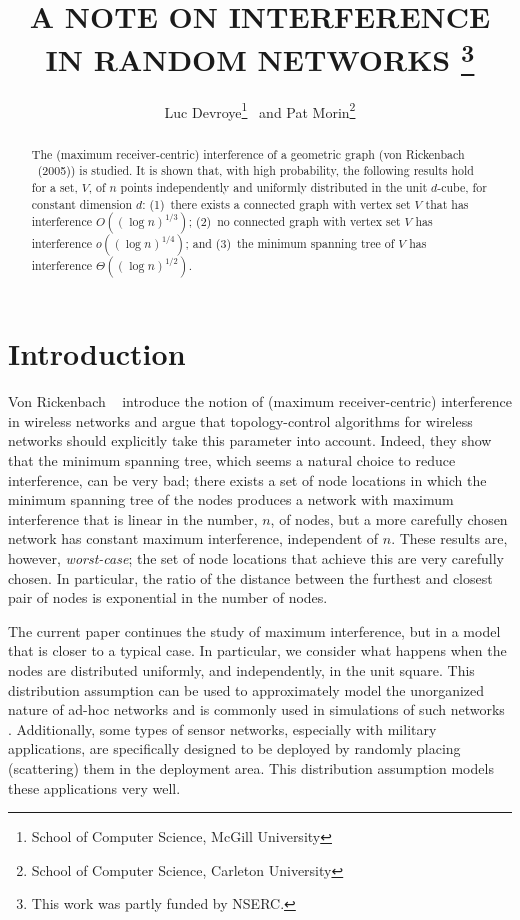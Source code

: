 \documentclass{patmorin}
\title{\MakeTextUppercase{A Note on Interference in Random Networks}%
   \thanks{This work was partly funded by NSERC.}}
\author{Luc Devroye\thanks{School of Computer Science, McGill University}
        \ and
        Pat Morin\thanks{School of Computer Science, Carleton University}}
\begin{document}
\maketitle

\begin{abstract}
  The (maximum receiver-centric) interference of a geometric graph
  (von Rickenbach \etal\ (2005)) is studied.  It is shown that,
  with high probability, the following results hold for a set, $V$,
  of $n$ points independently and uniformly distributed in the unit
  $d$-cube, for constant dimension $d$: (1)~there exists a connected
  graph with vertex set $V$ that has interference $O((\log n)^{1/3})$;
  (2)~no connected graph with vertex set $V$ has interference $o((\log
  n)^{1/4})$; and (3)~the minimum spanning tree of $V$ has interference
  $\Theta((\log n)^{1/2})$.
\end{abstract}

\section{Introduction}

Von Rickenbach \etal\ \cite{vR05,rwz09} introduce the notion of (maximum
receiver-centric) interference in wireless networks and argue that
topology-control algorithms for wireless networks should explicitly take
this parameter into account.  Indeed, they show that the minimum spanning
tree, which seems a natural choice to reduce interference, can be very
bad; there exists a set of node locations in which the minimum spanning
tree of the nodes produces a network with maximum interference that is
linear in the number, $n$, of nodes, but a more carefully chosen network
has constant maximum interference, independent of $n$.  These results are,
however, \emph{worst-case}; the set of node locations that achieve this
are very carefully chosen.  In particular, the ratio of the distance
between the furthest and closest pair of nodes is exponential in the
number of nodes.

The current paper continues the study of maximum interference, but in a
model that is closer to a typical case.  In particular, we consider what
happens when the nodes are distributed uniformly, and independently,
in the unit square.  This distribution assumption can be used to
approximately model the unorganized nature of ad-hoc networks and is
commonly used in simulations of such networks \cite{tma09}. Additionally, some
types of sensor networks, especially with military applications, are
specifically designed to be deployed by randomly placing (scattering)
them in the deployment area. This distribution assumption models these
applications very well.
\end{document}
